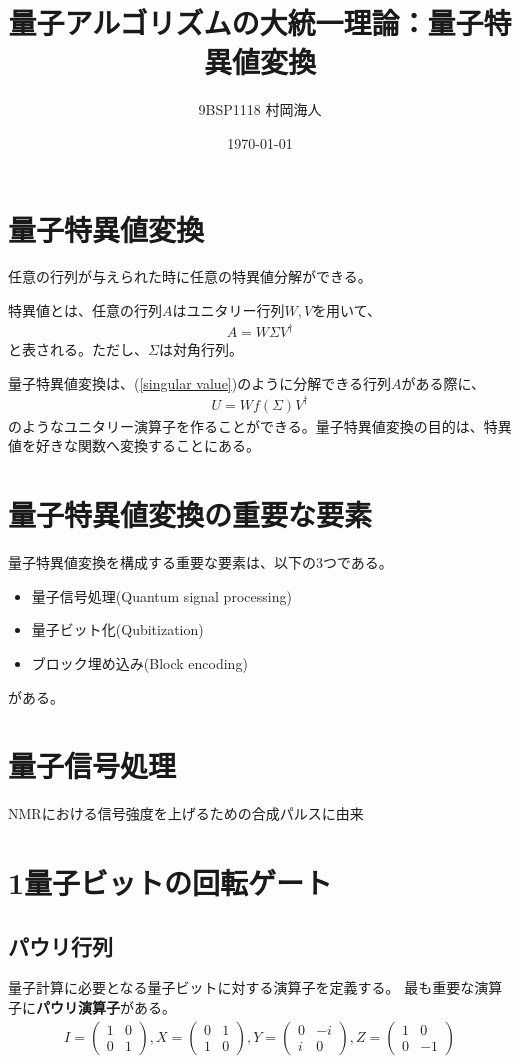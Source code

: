 \documentclass[platex,dvipdfmx]{jlreq}			%
\title{量子アルゴリズムの大統一理論：量子特異値変換}
\author{9BSP1118 村岡海人}
\date{\today}
\begin{document}
\section{量子特異値変換}
任意の行列が与えられた時に任意の特異値分解ができる。

特異値とは、任意の行列$A$はユニタリー行列$W, V$を用いて、
\begin{align}
    A = W \Sigma V^{\dagger}
    \label{singular value}
\end{align}
と表される。ただし、$\Sigma$は対角行列。

量子特異値変換は、(\ref{singular value})のように分解できる行列$A$がある際に、
\begin{align}
    U = W f(\Sigma)V^{\dagger} 
\end{align}
のようなユニタリー演算子を作ることができる。量子特異値変換の目的は、特異値を好きな関数へ変換することにある。

\section{量子特異値変換の重要な要素}
量子特異値変換を構成する重要な要素は、以下の3つである。
\begin{itemize}
    \item  量子信号処理(Quantum signal processing)
    \item  量子ビット化(Qubitization)
    \item  ブロック埋め込み(Block encoding)
\end{itemize}
がある。


\section{量子信号処理}
NMRにおける信号強度を上げるための合成パルスに由来

\section{1量子ビットの回転ゲート}
\subsection{パウリ行列}
量子計算に必要となる量子ビットに対する演算子を定義する。
最も重要な演算子に\textbf{パウリ演算子}がある。
\begin{align}
    I = \begin{pmatrix}
    1 & 0 \\
    0 & 1
    \end{pmatrix},
    X = \begin{pmatrix}
    0 & 1 \\
    1 & 0
    \end{pmatrix},
    Y = \begin{pmatrix}
    0 & -i \\
    i & 0
    \end{pmatrix},
    Z = \begin{pmatrix}
    1 & 0 \\
    0 & -1
    \end{pmatrix}
\end{align}
\end{document}
